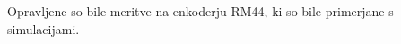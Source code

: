 \documentclass[a4paper,twoside,openright,12pt]{book}
\begin{document}
Opravljene so bile meritve na enkoderju RM44, ki so bile primerjane s simulacijami.
%
%
%
%
%
%
%
%
%
%
%
%
%
%
%
%
%
%
%
%
%
%
%
%
\end{document}
